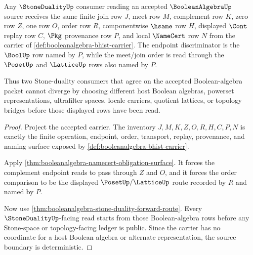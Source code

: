 \begin{theorem}
\label{thm:booleanalgebra-stone-source-lattice-determinacy}
Any $\StoneDualityUp$ consumer reading an accepted $\BooleanAlgebraUp$ source receives the same finite join row $J$, meet row $M$, complement row $K$, zero row $Z$, one row $O$, order row $R$, componentwise $\hsame$ row $H$, displayed $\Cont$ replay row $C$, $\Pkg$ provenance row $P$, and local $\NameCert$ row $N$ from the carrier of \autoref{def:booleanalgebra-bhist-carrier}. The endpoint discriminator is the $\BoolUp$ row named by $P$, while the meet/join order is read through the $\PosetUp$ and $\LatticeUp$ rows also named by $P$.

Thus two Stone-duality consumers that agree on the accepted Boolean-algebra packet cannot diverge by choosing different host Boolean algebras, powerset representations, ultrafilter spaces, locale carriers, quotient lattices, or topology bridges before those displayed rows have been read.
\end{theorem}
\begin{proof}
Project the accepted carrier. The inventory $J,M,K,Z,O,R,H,C,P,N$ is exactly the finite operation, endpoint, order, transport, replay, provenance, and naming surface exposed by \autoref{def:booleanalgebra-bhist-carrier}.

Apply \autoref{thm:booleanalgebra-namecert-obligation-surface}. It forces the complement endpoint reads to pass through $Z$ and $O$, and it forces the order comparison to be the displayed $\PosetUp/\LatticeUp$ route recorded by $R$ and named by $P$.

Now use \autoref{thm:booleanalgebra-stone-duality-forward-route}. Every $\StoneDualityUp$-facing read starts from those Boolean-algebra rows before any Stone-space or topology-facing ledger is public. Since the carrier has no coordinate for a host Boolean algebra or alternate representation, the source boundary is deterministic.
\end{proof}

